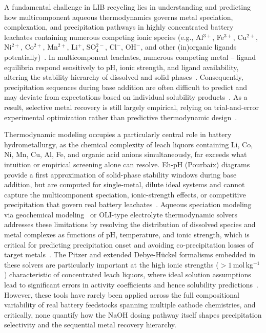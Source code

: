 \documentclass[final,2p,times]{elsarticle}
\begin{document}
A fundamental challenge in LIB recycling lies in understanding and predicting how multicomponent aqueous thermodynamics governs metal speciation, complexation, and precipitation pathways in highly concentrated battery leachates containing numerous competing ionic species (e.g., Al$^{3+}$, Fe$^{3+}$, Cu$^{2+}$, Ni$^{2+}$, Co$^{2+}$, Mn$^{2+}$, Li$^{+}$, SO$_4^{2-}$, Cl$^{-}$, OH$^{-}$, and other (in)organic ligands potentially)~\cite{zhou_current_2020,calvert_recovery_2019}. In multicomponent leachates, numerous competing metal -- ligand equilibria respond sensitively to pH, ionic strength, and ligand availability, altering the stability hierarchy of dissolved and solid phases~\cite{parkhurst_description_2013,bard_electrochemical_2022,crundwell_extractive_2011}. Consequently, precipitation sequences during base addition are often difficult to predict and may deviate from expectations based on individual solubility products~\cite{zanoletti_review_2024,kwon_fundamental_2020,free_hydrometallurgy_2021}. As a result, selective metal recovery is still largely empirical, relying on trial-and-error experimental optimization rather than predictive thermodynamic design~\cite{zanoletti_review_2024,kwon_fundamental_2020,georgi-maschler_development_2012,harper_recycling_2019,gaines_lithium-ion_2018}.

Thermodynamic modeling occupies a particularly central role in battery hydrometallurgy, as the chemical complexity of leach liquors containing Li, Co, Ni, Mn, Cu, Al, Fe, and organic acid anions simultaneously, far exceeds what intuition or empirical screening alone can resolve. Eh-pH (Pourbaix) diagrams provide a first approximation of solid-phase stability windows during base addition, but are computed for single-metal, dilute ideal systems and cannot capture the multicomponent speciation, ionic-strength effects, or competitive precipitation that govern real battery leachates~\cite{peng_extraction_2019, golmohammadzadeh_recovery_2018}. Aqueous speciation modeling via geochemical modeling~\cite{parkhurst_description_2013} or OLI-type electrolyte thermodynamic solvers~\cite{wang_overview_2017} addresses these limitations by resolving the distribution of dissolved species and metal complexes as functions of pH, temperature, and ionic strength, which is critical for predicting precipitation onset and avoiding co-precipitation losses of target metals~\cite{eriksson_algorithm_1979, wang_overview_2017}. The Pitzer and extended Debye-Hückel formalisms embedded in these solvers are particularly important at the high ionic strengths ($>1$\,mol\,kg$^{-1}$) characteristic of concentrated leach liquors, where ideal solution assumptions lead to significant errors in activity coefficients and hence solubility predictions~\cite{wang_overview_2017}. However, these tools have rarely been applied across the full compositional variability of real battery feedstocks spanning multiple cathode chemistries, and critically, none quantify how the NaOH dosing pathway itself shapes precipitation selectivity and the sequential metal recovery hierarchy.
\end{document}
